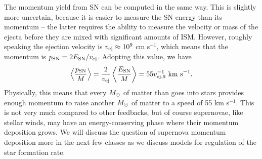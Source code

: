 The momentum yield from SN can be computed in the same way. This is slightly more uncertain, because it is easier to measure the SN energy than its momentum -- the latter requires the ability to measure the velocity or mass of the ejecta before they are mixed with significant amounts of ISM. However, roughly speaking the ejection velocity is $v_{\rm ej} \approx 10^9$ cm s$^{-1}$, which means that the momentum is $p_{\rm SN} = 2 E_{\rm SN}/v_{\rm ej}$. Adopting this value, we have
\begin{equation}
\left\langle \frac{p_{\rm SN}}{M}\right\rangle = \frac{2}{v_{\rm ej}} \left\langle \frac{E_{\rm SN}}{M}\right\rangle = 55 v_{\rm ej,9}^{-1} \mbox{ km s}^{-1}.
\end{equation}
Physically, this means that every $M_{\odot}$ of matter than goes into stars provides enough momentum to raise another $M_{\odot}$ of matter to a speed of 55 km s$^{-1}$. This is not very much compared to other feedbacks, but of course supernovae, like stellar winds, may have an energy-conserving phase where their momentum deposition grows. We will discuss the question of supernova momentum deposition more in the next few classes as we discuss models for regulation of the star formation rate.